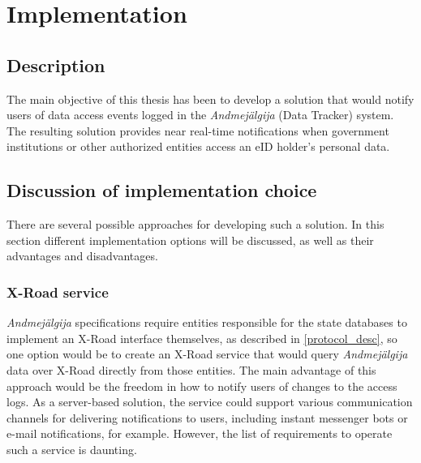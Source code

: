 \section{Implementation}

\subsection{Description}

The main objective of this thesis has been to develop a solution that would notify users of data access events logged in the \textit{Andmejälgija} (Data Tracker) system. The resulting solution provides near real-time notifications when government institutions or other authorized entities access an eID holder's personal data.

\subsection{Discussion of implementation choice}
There are several possible approaches for developing such a solution. In this section different implementation options will be discussed, as well as their advantages and disadvantages.

\subsubsection{X-Road service}
\textit{Andmejälgija} specifications require entities responsible for the state databases to implement an X-Road interface themselves, as described in \ref{protocol_desc}, so one option would be to create an X-Road service that would query \textit{Andmejälgija} data over X-Road directly from those entities. The main advantage of this approach would be the freedom in how to notify users of changes to the access logs. As a server-based solution, the service could support various communication channels for delivering notifications to users, including instant messenger bots or e-mail notifications, for example. However, the list of requirements to operate such a service is daunting. 

